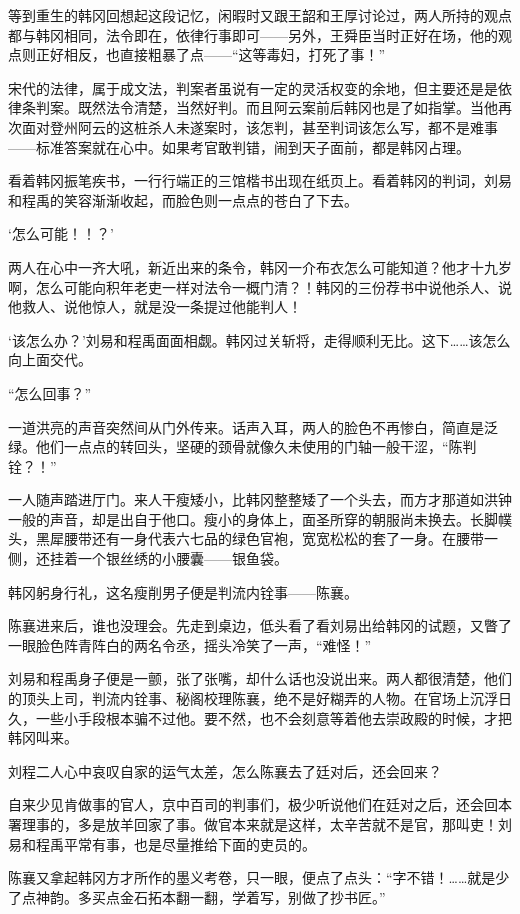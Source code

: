 等到重生的韩冈回想起这段记忆，闲暇时又跟王韶和王厚讨论过，两人所持的观点都与韩冈相同，法令即在，依律行事即可——另外，王舜臣当时正好在场，他的观点则正好相反，也直接粗暴了点——“这等毒妇，打死了事！”

宋代的法律，属于成文法，判案者虽说有一定的灵活权变的余地，但主要还是是依律条判案。既然法令清楚，当然好判。而且阿云案前后韩冈也是了如指掌。当他再次面对登州阿云的这桩杀人未遂案时，该怎判，甚至判词该怎么写，都不是难事——标准答案就在心中。如果考官敢判错，闹到天子面前，都是韩冈占理。

看着韩冈振笔疾书，一行行端正的三馆楷书出现在纸页上。看着韩冈的判词，刘易和程禹的笑容渐渐收起，而脸色则一点点的苍白了下去。

‘怎么可能！！？’

两人在心中一齐大吼，新近出来的条令，韩冈一介布衣怎么可能知道？他才十九岁啊，怎么可能向积年老吏一样对法令一概门清？！韩冈的三份荐书中说他杀人、说他救人、说他惊人，就是没一条提过他能判人！

‘该怎么办？’刘易和程禹面面相觑。韩冈过关斩将，走得顺利无比。这下……该怎么向上面交代。

“怎么回事？”

一道洪亮的声音突然间从门外传来。话声入耳，两人的脸色不再惨白，简直是泛绿。他们一点点的转回头，坚硬的颈骨就像久未使用的门轴一般干涩，“陈判铨？！”

一人随声踏进厅门。来人干瘦矮小，比韩冈整整矮了一个头去，而方才那道如洪钟一般的声音，却是出自于他口。瘦小的身体上，面圣所穿的朝服尚未换去。长脚幞头，黑犀腰带还有一身代表六七品的绿色官袍，宽宽松松的套了一身。在腰带一侧，还挂着一个银丝绣的小腰囊——银鱼袋。

韩冈躬身行礼，这名瘦削男子便是判流内铨事——陈襄。

陈襄进来后，谁也没理会。先走到桌边，低头看了看刘易出给韩冈的试题，又瞥了一眼脸色阵青阵白的两名令丞，摇头冷笑了一声，“难怪！”

刘易和程禹身子便是一颤，张了张嘴，却什么话也没说出来。两人都很清楚，他们的顶头上司，判流内铨事、秘阁校理陈襄，绝不是好糊弄的人物。在官场上沉浮日久，一些小手段根本骗不过他。要不然，也不会刻意等着他去崇政殿的时候，才把韩冈叫来。

刘程二人心中哀叹自家的运气太差，怎么陈襄去了廷对后，还会回来？

自来少见肯做事的官人，京中百司的判事们，极少听说他们在廷对之后，还会回本署理事的，多是放羊回家了事。做官本来就是这样，太辛苦就不是官，那叫吏！刘易和程禹平常有事，也是尽量推给下面的吏员的。

陈襄又拿起韩冈方才所作的墨义考卷，只一眼，便点了点头：“字不错！……就是少了点神韵。多买点金石拓本翻一翻，学着写，别做了抄书匠。”


